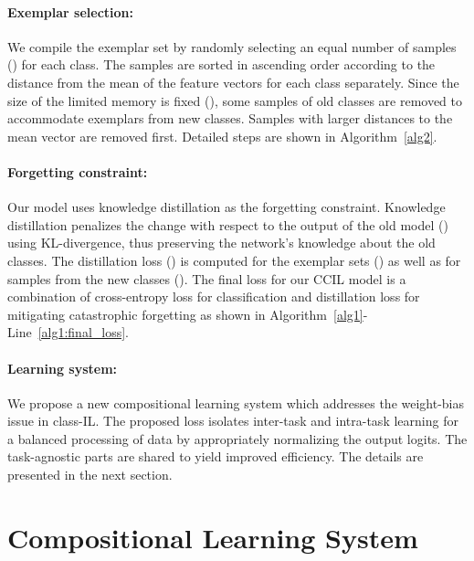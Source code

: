\documentclass[final]{cvpr}
\begin{document}
\paragraph{Exemplar selection:}
We compile the exemplar set by randomly selecting an equal number of samples () for each class. The samples are sorted in ascending order according to the distance from the mean of the feature vectors  for each class separately.
Since the size of the limited memory is fixed (), some samples of old classes are removed to accommodate exemplars from new classes. Samples with larger distances to the mean vector are removed first. Detailed steps are shown in Algorithm~\ref{alg2}.

\paragraph{Forgetting constraint:}
Our model uses knowledge distillation as the forgetting constraint. Knowledge distillation penalizes the change with respect to the output of the old model () using KL-divergence, thus preserving the network's knowledge about the old classes. The distillation loss () is computed for the exemplar sets () as well as for samples from the new classes (). The final loss for our CCIL model is a combination of cross-entropy loss  for classification and distillation loss  for mitigating catastrophic forgetting as shown in Algorithm~\ref{alg1}-Line~\ref{alg1:final_loss}.

\paragraph{Learning system:}
We propose a new compositional learning system which addresses the weight-bias issue in class-IL. The proposed loss isolates inter-task and intra-task learning for a balanced processing of data by appropriately normalizing the output logits. The task-agnostic parts are shared to yield improved efficiency. The details are presented in the next section.

















 

\section{Compositional Learning System} \label{sec:compo_loss}
\end{document}
